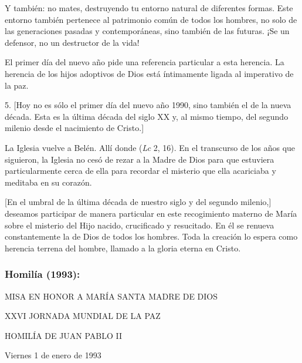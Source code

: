 \begin{body}
	Y también: no mates, destruyendo tu entorno natural de diferentes formas. Este entorno también pertenece al patrimonio común de todos los hombres, no solo de las generaciones pasadas y contemporáneas, sino también de las futuras. ¡Se un defensor, no un destructor de la vida!

	El primer día del nuevo año pide una referencia particular a esta herencia. La herencia de los hijos adoptivos de Dios está íntimamente ligada al imperativo de la paz.

	5. {[}Hoy no es sólo el primer día del nuevo año 1990, sino también el de la nueva década. Esta es la última década del siglo XX y, al mismo tiempo, del segundo milenio desde el nacimiento de Cristo.{]}

	La Iglesia vuelve a Belén. Allí donde  (\emph{Lc} 2, 16). En el transcurso de los años que siguieron, la Iglesia no cesó de rezar a la Madre de Dios para que estuviera particularmente cerca de ella para recordar el misterio que ella acariciaba y meditaba en su corazón.

	{[}En el umbral de la última década de nuestro siglo y del segundo milenio,{]} deseamos participar de manera particular en este recogimiento materno de María sobre el misterio del Hijo nacido, crucificado y resucitado. En él se renueva constantemente la  de Dios de todos los hombres. Toda la creación lo espera como herencia terrena del hombre, llamado a la gloria eterna en Cristo.

	\subsubsection{Homilía (1993):} MISA EN HONOR A MARÍA SANTA MADRE DE DIOS

	XXVI JORNADA MUNDIAL DE LA PAZ

	HOMILÍA DE JUAN PABLO II

	Viernes 1 de enero de 1993


\end{body}

